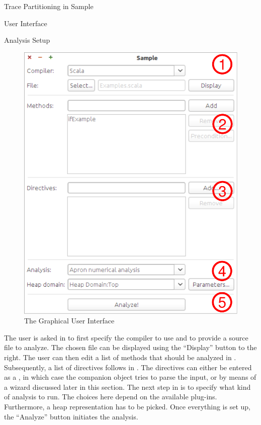 \begin{chapter}{Trace Partitioning in Sample}
\begin{section}{User Interface}
\begin{subsection}{Analysis Setup}
			\begin{figure}
				\centering
				\includegraphics[scale=0.7]{Images/GUI.pdf}
				\caption{The Graphical User Interface}
				\label{figure:GUI}
			\end{figure}

			The user is asked in \one to first specify the compiler to use and to provide a source file to analyze. The chosen file can be displayed using the ``Display'' button to the right. The user can then edit a list of methods that should be analyzed in \two. Subsequently, a list of directives follows in \three. The directives can either be entered as a , in which case the  companion object tries to parse the input, or by means of a wizard discussed later in this section. The next step in \four is to specify what kind of analysis to run. The choices here depend on the available plug-ins. Furthermore, a heap representation has to be picked. Once everything is set up, the ``Analyze'' button \five initiates the analysis.
		\end{subsection}


\end{section}
\end{chapter}
